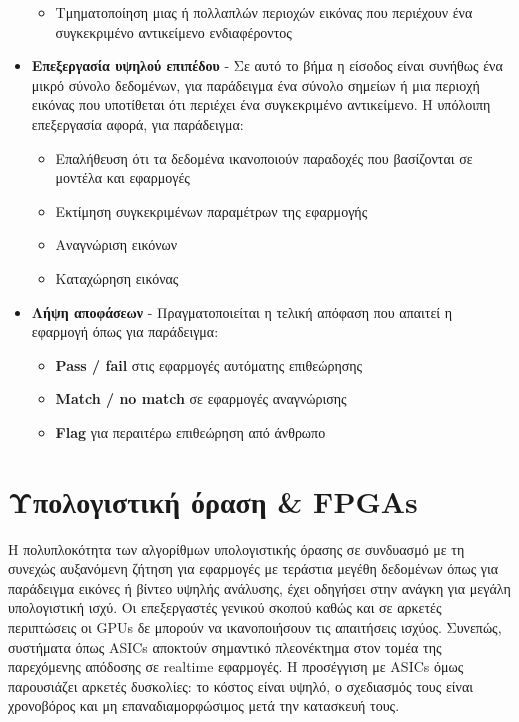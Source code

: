 \begin{itemize}
\begin{itemize}
		\item Τμηματοποίηση μιας ή πολλαπλών περιοχών εικόνας που περιέχουν ένα συγκεκριμένο αντικείμενο ενδιαφέροντος
	\end{itemize}
	\item \textbf{Επεξεργασία υψηλού επιπέδου} - Σε αυτό το βήμα η είσοδος είναι συνήθως ένα μικρό σύνολο δεδομένων, για παράδειγμα ένα σύνολο σημείων ή μια περιοχή εικόνας που υποτίθεται ότι περιέχει ένα συγκεκριμένο αντικείμενο. Η υπόλοιπη επεξεργασία αφορά, για παράδειγμα:
	\begin{itemize}
		\item Επαλήθευση ότι τα δεδομένα ικανοποιούν παραδοχές που βασίζονται σε μοντέλα και εφαρμογές
		\item Εκτίμηση συγκεκριμένων παραμέτρων της εφαρμογής
		\item Αναγνώριση εικόνων
		\item Καταχώρηση εικόνας
	\end{itemize}
	\item \textbf{Λήψη αποφάσεων} - Πραγματοποιείται η τελική απόφαση που απαιτεί η εφαρμογή όπως για παράδειγμα:
	\begin{itemize}
		\item \textbf{Pass / fail} στις εφαρμογές αυτόματης επιθεώρησης
		\item \textbf{Match / no match} σε εφαρμογές αναγνώρισης
		\item \textbf{Flag} για περαιτέρω επιθεώρηση από άνθρωπο
	\end{itemize}
\end{itemize}
\section{Υπολογιστική όραση \& FPGAs}

Η πολυπλοκότητα των αλγορίθμων υπολογιστικής όρασης σε συνδυασμό με τη συνεχώς αυξανόμενη ζήτηση για εφαρμογές με τεράστια μεγέθη δεδομένων όπως για παράδειγμα εικόνες ή βίντεο υψηλής ανάλυσης, έχει οδηγήσει στην ανάγκη για μεγάλη υπολογιστική ισχύ. Οι επεξεργαστές γενικού σκοπού καθώς και σε αρκετές περιπτώσεις οι GPUs δε μπορούν να ικανοποιήσουν τις απαιτήσεις ισχύος. Συνεπώς, συστήματα όπως ASICs αποκτούν σημαντικό πλεονέκτημα στον τομέα της παρεχόμενης απόδοσης σε realtime εφαρμογές. Η προσέγγιση με ASICs όμως παρουσιάζει αρκετές δυσκολίες: το κόστος είναι υψηλό, ο σχεδιασμός τους είναι χρονοβόρος και μη επαναδιαμορφώσιμος μετά την κατασκευή τους.

